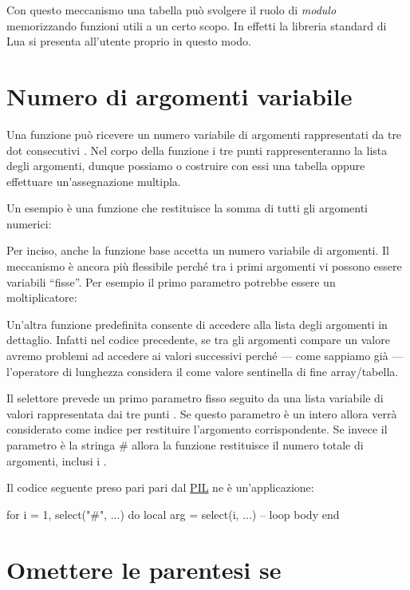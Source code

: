 Con questo meccanismo una tabella può svolgere il ruolo di \emph{modulo}
memorizzando funzioni utili a un certo scopo. In effetti la libreria standard
di Lua si presenta all'utente proprio in questo modo.



\section{Numero di argomenti variabile}

Una funzione può ricevere un numero variabile di argomenti rappresentati da tre
dot consecutivi . Nel corpo della funzione i tre punti
rappresenteranno la lista degli argomenti, dunque possiamo o costruire con essi
una tabella oppure effettuare un'assegnazione multipla.

Un esempio è una funzione che restituisce la somma di tutti gli argomenti
numerici:

Per inciso, anche la funzione base  accetta un numero variabile di
argomenti. Il meccanismo è ancora più flessibile perché tra i primi argomenti
vi possono essere variabili ``fisse''. Per esempio il primo parametro potrebbe
essere un moltiplicatore:

Un'altra funzione predefinita  consente di accedere alla lista degli
argomenti in dettaglio. Infatti nel codice precedente, se tra gli argomenti
compare un valore  avremo problemi ad accedere ai valori successivi
perché --- come sappiamo già --- l'operatore di lunghezza \key{\#} considera il
 come valore sentinella di fine array/tabella.

Il selettore prevede un primo parametro fisso seguito da una lista variabile di
valori rappresentata dai tre punti . Se questo parametro è un intero
allora verrà considerato come indice per restituire l'argomento corrispondente.
Se invece il parametro è la stringa \key\# allora la funzione restituisce il
numero totale di argomenti, inclusi i .

Il codice seguente preso pari pari dal \href{http://www.lua.org/pil/}{PIL} ne è
un'applicazione:
\begin{lines}
for i = 1, select("#", ...) do
    local arg = select(i, ...)
    -- loop body
end
\end{lines}


\section{Omettere le parentesi se}

